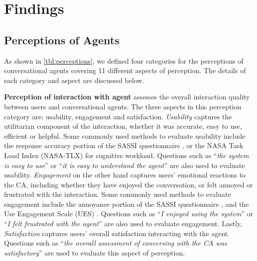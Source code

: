 
\section{Findings}

\subsection{Perceptions of Agents}


As shown in \autoref{tbl:perceptions}, we defined four categories for the perceptions of conversational agents covering 11 different aspects of perception. The details of each category and aspect are discussed below.


\textbf{Perception of interaction with agent} assesses the overall interaction quality between users and conversational agents. The three aspects in this perception category  are: usability, engagement and satisfaction. \textit{Usability} captures the utilitarian component of the interaction, whether it was accurate, easy to use, efficient or helpful. Some commonly used methods to evaluate usability include the response accuracy portion of the SASSI questionnaire \cite{hone2000towards}, or the NASA Task Load Index (NASA-TLX) \cite{hart1988development} for cognitive workload. Questions such as ``\textit{the system is easy to use}'' or ``\textit{it is easy to understand the agent}'' are also used to evaluate usability. \textit{Engagement} on the other hand captures users' emotional reactions to the CA, including whether they have enjoyed the conversation, or felt annoyed or frustrated with the interaction. Some commonly used methods to evaluate engagement include the annoyance portion of the SASSI questionnaire \cite{hone2000towards}, and the Use Engagement Scale (UES) \cite{o2018practical}. Questions such as ``\textit{I enjoyed using the system}'' or ``\textit{I felt frustrated with the agent}'' are also used to evaluate engagement. Lastly, \textit{Satisfaction} captures users' overall satisfaction interacting with the agent. Questions such as ``\textit{the overall assessment of conversing with the CA was satisfactory}'' are used to evaluate this aspect of perception.




